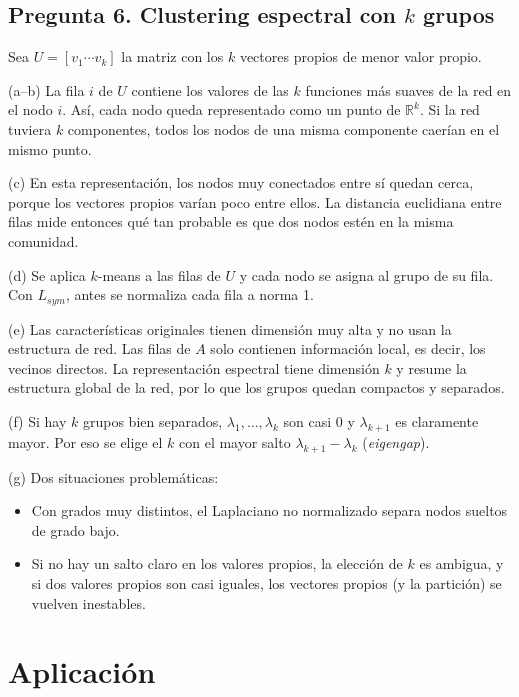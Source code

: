 \documentclass[11pt,a4paper]{article}
\begin{document}
\subsection{Pregunta 6. Clustering espectral con $k$ grupos}

Sea $U=[v_1\cdots v_k]$ la matriz con los $k$ vectores propios de menor valor propio.

(a--b) La fila $i$ de $U$ contiene los valores de las $k$ funciones más suaves de la red en el nodo $i$. Así, cada nodo queda representado como un punto de $\mathbb{R}^k$. Si la red tuviera $k$ componentes, todos los nodos de una misma componente caerían en el mismo punto.

(c) En esta representación, los nodos muy conectados entre sí quedan cerca, porque los vectores propios varían poco entre ellos. La distancia euclidiana entre filas mide entonces qué tan probable es que dos nodos estén en la misma comunidad.

(d) Se aplica $k$-means a las filas de $U$ y cada nodo se asigna al grupo de su fila. Con $L_{sym}$, antes se normaliza cada fila a norma 1.

(e) Las características originales tienen dimensión muy alta y no usan la estructura de red. Las filas de $A$ solo contienen información local, es decir, los vecinos directos. La representación espectral tiene dimensión $k$ y resume la estructura global de la red, por lo que los grupos quedan compactos y separados.

(f) Si hay $k$ grupos bien separados, $\lambda_1,\dots,\lambda_k$ son casi $0$ y $\lambda_{k+1}$ es claramente mayor. Por eso se elige el $k$ con el mayor salto $\lambda_{k+1}-\lambda_k$ (\emph{eigengap}).

(g) Dos situaciones problemáticas:
\begin{itemize}[leftmargin=1.5em]
\item Con grados muy distintos, el Laplaciano no normalizado separa nodos sueltos de grado bajo.
\item Si no hay un salto claro en los valores propios, la elección de $k$ es ambigua, y si dos valores propios son casi iguales, los vectores propios (y la partición) se vuelven inestables.
\end{itemize}

\section{Aplicación}
\end{document}
